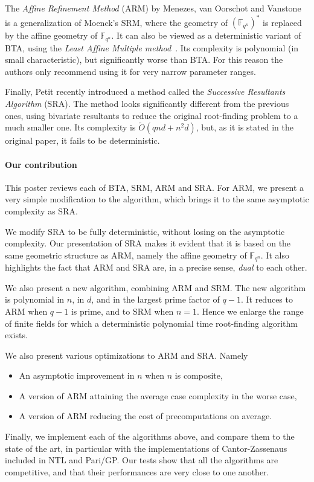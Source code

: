 \documentclass[11pt]{article}
\newcommand{\ff}[1]{\mathbb{F}_{#1}}
\newcommand{\qq}{q}
\newcommand{\nn}{n}
\newcommand{\qn}{{\qq^\nn}}
\newcommand{\extf}{\ff{\qn}}
\newcommand{\bigOt}{\tilde{O}}
\newcounter{algo}
\begin{document}
The \emph{Affine Refinement Method} (ARM) by Menezes, van Oorschot and
Vanstone~\cite{MenezesOV88,OorschotV89,Menvanovans92} is a
generalization of Moenck's SRM, where the geometry of $(\extf)^\ast$
is replaced by the affine geometry of $\extf$. It can also be viewed
as a deterministic variant of BTA, using the \emph{Least Affine
  Multiple method}~\cite{mBER84a}. Its complexity is polynomial (in
small characteristic), but significantly worse than BTA. For this
reason the authors only recommend using it for very narrow parameter
ranges.

Finally, Petit\cite{cgUCL-P14} recently introduced a method called the
\emph{Successive Resultants Algorithm} (SRA). The method looks
significantly different from the previous ones, using bivariate
resultants to reduce the original root-finding problem to a much
smaller one. Its complexity is $\bigOt(qnd+n^2d)$, but, as it is
stated in the original paper, it fails to be deterministic.


\paragraph{Our contribution} This poster reviews each of BTA, SRM, ARM
and SRA.  For ARM, we present a very simple modification to the
algorithm, which brings it to the same asymptotic complexity as SRA.

We modify SRA to be fully deterministic, without losing on the
asymptotic complexity. Our presentation of SRA makes it evident that
it is based on the same geometric structure as ARM, namely the affine
geometry of $\extf$. It also highlights the fact that ARM and SRA are,
in a precise sense, \emph{dual} to each other.

We also present a new algorithm, combining ARM and SRM. The new
algorithm is polynomial in $n$, in $d$, and in the largest prime
factor of $q-1$. It reduces to ARM when $q-1$ is prime, and to SRM
when $n=1$. Hence we enlarge the range of finite fields for which a
deterministic polynomial time root-finding algorithm exists.

We also present various optimizations to ARM and SRA. Namely
\begin{itemize}
\item An asymptotic improvement in $n$ when $n$ is composite,
\item A version of ARM attaining the average case complexity in the
  worse case,
\item A version of ARM reducing the cost of precomputations on
  average.
\end{itemize}

Finally, we implement each of the algorithms above, and compare them
to the state of the art, in particular with the implementations of
Cantor-Zassenaus included in NTL and Pari/GP. Our tests show that all
the algorithms are competitive, and that their performances are very
close to one another.




\end{document}

